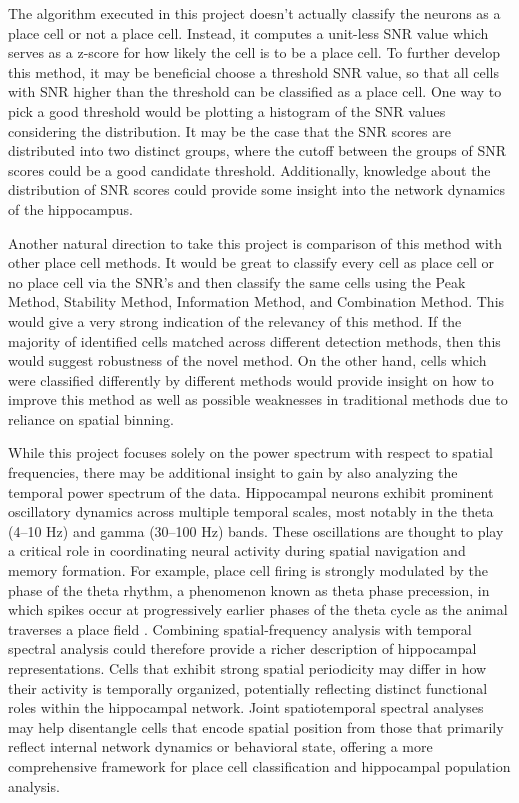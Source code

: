 \documentclass[preprint]{aastex701}
\begin{document}
The algorithm executed in this project doesn't actually classify the neurons as a place cell or not a place cell. Instead, it computes a unit-less SNR value which serves as a z-score for how likely the cell is to be a place cell. To further develop this method, it may be beneficial choose a threshold SNR value, so that all cells with SNR higher than the threshold can be classified as a place cell. One way to pick a good threshold would be plotting a histogram of the SNR values considering the distribution. It may be the case that the SNR scores are distributed into two distinct groups, where the cutoff between the groups of SNR scores could be a good candidate threshold. Additionally, knowledge about the distribution of SNR scores could provide some insight into the network dynamics of the hippocampus. 

Another natural direction to take this project is comparison of this method with other place cell methods. It would be great to classify every cell as place cell or no place cell via the SNR's and then classify the same cells using the Peak Method, Stability Method, Information Method, and Combination Method. \citep{grijseels2021choice} This would give a very strong indication of the relevancy of this method. If the majority of identified cells matched across different detection methods, then this would suggest robustness of the novel method. On the other hand, cells which were classified differently by different methods would provide insight on how to improve this method as well as possible  weaknesses in traditional methods due to reliance on spatial binning.

While this project focuses solely on the power spectrum with respect to spatial frequencies, there may be additional insight to gain by also analyzing the temporal power spectrum of the data. Hippocampal neurons exhibit prominent oscillatory dynamics across multiple temporal scales, most notably in the theta (4--10 Hz) and gamma (30--100 Hz) bands. These oscillations are thought to play a critical role in coordinating neural activity during spatial navigation and memory formation. For example, place cell firing is strongly modulated by the phase of the theta rhythm, a phenomenon known as theta phase precession, in which spikes occur at progressively earlier phases of the theta cycle as the animal traverses a place field \citep{okeefe1993phase}. Combining spatial-frequency analysis with temporal spectral analysis could therefore provide a richer description of hippocampal representations. Cells that exhibit strong spatial periodicity may differ in how their activity is temporally organized, potentially reflecting distinct functional roles within the hippocampal network. Joint spatiotemporal spectral analyses may help disentangle cells that encode spatial position from those that primarily reflect internal network dynamics or behavioral state, offering a more comprehensive framework for place cell classification and hippocampal population analysis.
\end{document}

